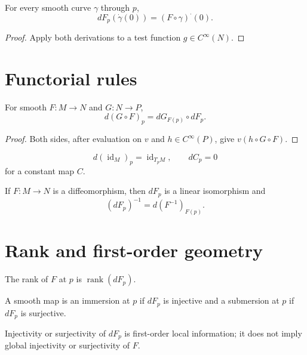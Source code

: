 \begin{theorem}\label{thm:vii04-curve-pushforward}
For every smooth curve \(\gamma\) through \(p\),
\[
dF_p(\dot\gamma(0))=(F\circ\gamma)^{\boldsymbol\cdot}(0).
\]
\end{theorem}
\begin{proof}
Apply both derivations to a test function \(g\in C^\infty(N)\).
\end{proof}

\section{Functorial rules}
\begin{theorem}\label{thm:vii04-chain-rule}
For smooth \(F:M\to N\) and \(G:N\to P\),
\[
d(G\circ F)_p=dG_{F(p)}\circ dF_p.
\]
\end{theorem}
\begin{proof}
Both sides, after evaluation on \(v\) and \(h\in C^\infty(P)\), give \(v(h\circ G\circ F)\).
\end{proof}

\begin{proposition}\label{prop:vii04-identity-constant}
\[
d(\operatorname{id}_M)_p=\operatorname{id}_{T_pM},
\qquad
dC_p=0
\]
for a constant map \(C\).
\end{proposition}

\begin{corollary}[Diffeomorphisms]\label{cor:vii04-diffeomorphism}
If \(F:M\to N\) is a diffeomorphism, then \(dF_p\) is a linear isomorphism and
\[
(dF_p)^{-1}=d(F^{-1})_{F(p)}.
\]
\end{corollary}

\section{Rank and first-order geometry}
\begin{definition}[Rank]\label{def:vii04-rank}
The rank of \(F\) at \(p\) is \(\operatorname{rank}(dF_p)\).
\end{definition}

\begin{definition}\label{def:vii04-immersion-submersion}
A smooth map is an immersion at \(p\) if \(dF_p\) is injective and a submersion at \(p\) if \(dF_p\) is surjective.
\end{definition}

\begin{warning}\label{warning:vii04-local-global}
Injectivity or surjectivity of \(dF_p\) is first-order local information; it does not imply global injectivity or surjectivity of \(F\).
\end{warning}


